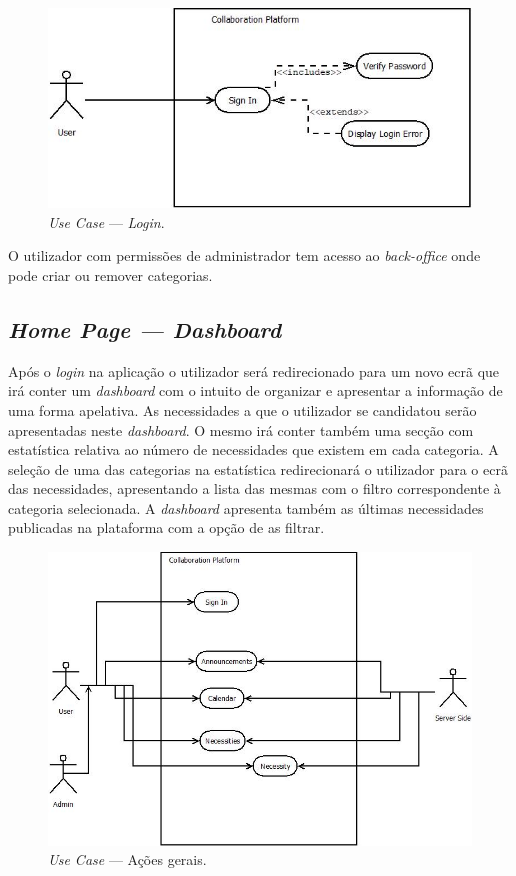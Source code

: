 \begin{figure}[H]
    \centering
    \includegraphics[scale=0.8]{figures/Login Use Case.jpeg}
    \caption{\textit{Use Case} --- \textit{Login}.}\label{fig:uc:login}
\end{figure}

O utilizador com permissões de administrador tem acesso ao \textit{back-office} onde pode criar ou remover categorias.

\subsection{\textit{Home Page --- Dashboard}}\label{subsec:dashboard}

Após o \textit{login} na aplicação o utilizador será redirecionado para um novo ecrã que irá conter um \textit{dashboard} com o intuito de organizar e 
apresentar a informação de uma forma apelativa. As necessidades a que o utilizador se candidatou serão apresentadas neste \textit{dashboard}. 
O mesmo irá conter também uma secção com estatística relativa ao número de necessidades que existem em cada categoria. 
A seleção de uma das categorias na estatística redirecionará o utilizador para o ecrã das necessidades, 
apresentando a lista das mesmas com o filtro correspondente à categoria selecionada. 
A \textit{dashboard} apresenta também as últimas necessidades publicadas na plataforma com a opção de as filtrar.

\begin{figure}[H]
    \centering
    \includegraphics[scale=0.8]{figures/General Actions.jpeg}
    \caption{\textit{Use Case} --- Ações gerais.}\label{fig:uc:generalactions}
\end{figure}

